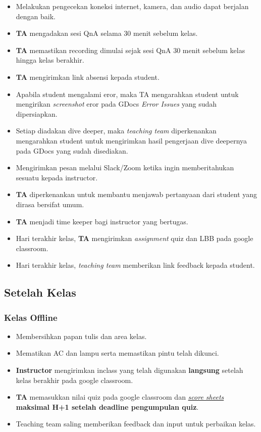\documentclass[
]{book}
\providecommand{\tightlist}{%
  \setlength{\itemsep}{0pt}\setlength{\parskip}{0pt}}
\begin{document}
\begin{itemize}
\tightlist
\item
  Melakukan pengecekan koneksi internet, kamera, dan audio dapat berjalan dengan baik.
\item
  \textbf{TA} mengadakan sesi QnA selama 30 menit sebelum kelas.
\item
  \textbf{TA} memastikan recording dimulai sejak sesi QnA 30 menit sebelum kelas hingga kelas berakhir.
\item
  \textbf{TA} mengirimkan link absensi kepada student.
\item
  Apabila student mengalami eror, maka TA mengarahkan student untuk mengirikan \emph{screenshot} eror pada GDocs \emph{Error Issues} yang sudah dipersiapkan.
\item
  Setiap diadakan dive deeper, maka \emph{teaching team} diperkenankan mengarahkan student untuk mengirimkan hasil pengerjaan dive deepernya pada GDocs yang sudah disediakan.
\item
  Mengirimkan pesan melalui Slack/Zoom ketika ingin memberitahukan sesuatu kepada instructor.
\item
  \textbf{TA} diperkenankan untuk membantu menjawab pertanyaan dari student yang dirasa bersifat umum.
\item
  \textbf{TA} menjadi time keeper bagi instructor yang bertugas.
\item
  Hari terakhir kelas, \textbf{TA} mengirimkan \emph{assignment} quiz dan LBB pada google classroom.
\item
  Hari terakhir kelas, \emph{teaching team} memberikan link feedback kepada student.
\end{itemize}

\hypertarget{setelah-kelas}{%
\subsection{Setelah Kelas}\label{setelah-kelas}}

\hypertarget{kelas-offline-2}{%
\subsubsection{Kelas Offline}\label{kelas-offline-2}}

\begin{itemize}
\tightlist
\item
  Membersihkan papan tulis dan area kelas.
\item
  Mematikan AC dan lampu serta memastikan pintu telah dikunci.
\item
  \textbf{Instructor} mengirimkan inclass yang telah digunakan \textbf{langsung} setelah kelas berakhir pada google classroom.
\item
  \textbf{TA} memasukkan nilai quiz pada google classroom dan \href{https://docs.google.com/spreadsheets/d/1cGJ0pn9k9gKCBnceWVwaL9D7BBDMNjLh8uPYlaBlJi8/edit?usp=sharing}{\emph{score sheets}} \textbf{maksimal H+1 setelah deadline pengumpulan quiz}.
\item
  Teaching team saling memberikan feedback dan input untuk perbaikan kelas.
\end{itemize}
\end{document}
